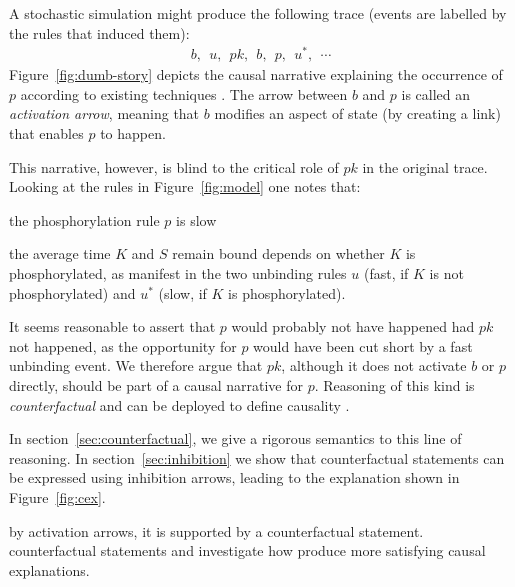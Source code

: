 A stochastic simulation \cite{DanosEtAl-APLAS07} might produce the
following trace (events are labelled by the rules that induced them):
\begin{align}\label{example-trace} b,\ \ u,\ \ pk,\ \ b,\ \ p,\ \
  u^{*},\ \ \cdots
\end{align} Figure~\ref{fig:dumb-story} depicts the causal narrative
explaining the occurrence of $p$ according to existing techniques
\cite{DBLP:conf/fsttcs/DanosFFHH12,DanosEtAl-CONCUR07}. The arrow
between $b$ and $p$ is called an \textit{activation arrow}, meaning
that $b$ modifies an aspect of state (by creating a link) that enables
$p$ to happen.



This narrative, however, is blind to the critical role of $pk$ in the
original trace. Looking at the rules in Figure~\ref{fig:model} one
notes that:
\begin{inparaenum}[(i)]
\item the phosphorylation rule $p$ is slow
\item the average time $K$ and $S$ remain bound depends on whether $K$
  is phosphorylated, as manifest in the two unbinding rules $u$ (fast,
  if $K$ is not phosphorylated) and $u^{*}$ (slow, if $K$ is
  phosphorylated).
\end{inparaenum} It seems reasonable to assert that $p$ would probably
not have happened had $pk$ not happened, as the opportunity for $p$
would have been cut short by a fast unbinding event. We therefore
argue that $pk$, although it does not activate $b$ or $p$ directly,
should be part of a causal narrative for $p$. Reasoning of this kind
is \textit{counterfactual} and can be deployed to define causality
\cite{lewis1974causation,lewis2000causation}.

In section~\ref{sec:counterfactual}, we give a rigorous semantics to
this line of reasoning. In section~\ref{sec:inhibition} we show that
counterfactual statements can be expressed using inhibition arrows,
leading to the explanation shown in Figure~\ref{fig:cex}.

by activation arrows, it is supported by a counterfactual statement.
counterfactual statements and investigate how %
produce more satisfying causal explanations.